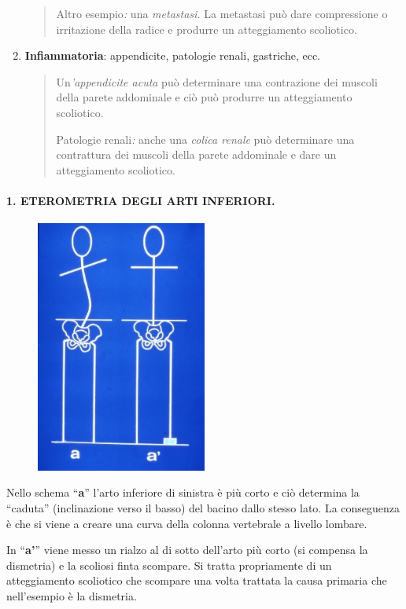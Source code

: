 \begin{enumerate}
\begin{quote}
Altro esempio\emph{:} una \emph{metastasi.} La metastasi può dare
compressione o irritazione della radice e produrre un atteggiamento
scoliotico.
\end{quote}

\item
  \textbf{Infiammatoria}: appendicite, patologie renali, gastriche, ecc.


\begin{quote}
Un\emph{'appendicite acuta} può determinare una contrazione dei muscoli
della parete addominale e ciò può produrre un atteggiamento scoliotico.

Patologie renali\emph{:} anche una \emph{colica renale} può determinare
una contrattura dei muscoli della parete addominale e dare un
atteggiamento scoliotico.
\end{quote}
\end{enumerate}
\paragraph{1. ETEROMETRIA DEGLI ARTI INFERIORI.}
\begin{figure}[!ht]
\centering
	\includegraphics[width=0.5\textwidth]{012/image1.jpeg}
\end{figure}

Nello schema ``\textbf{a}'' l'arto inferiore di sinistra è più corto e
ciò determina la ``caduta'' (inclinazione verso il basso) del bacino
dallo stesso lato. La conseguenza è che si viene a creare una curva
della colonna vertebrale a livello lombare.

In ``\textbf{a'}'' viene messo un rialzo al di sotto dell'arto più corto
(si compensa la dismetria) e la scoliosi finta scompare. Si tratta
propriamente di un atteggiamento scoliotico che scompare una volta
trattata la causa primaria che nell'esempio è la dismetria.

